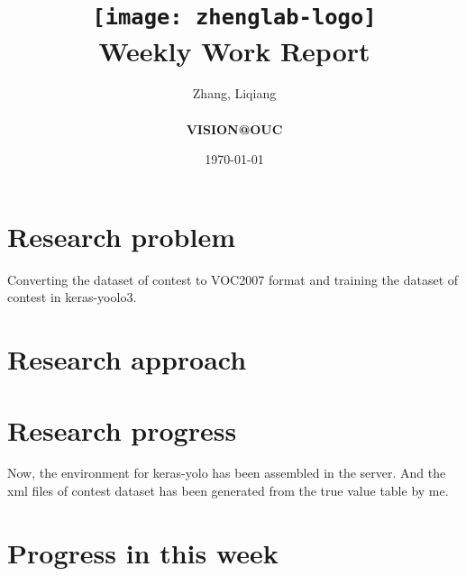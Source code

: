 \documentclass[a4paper]{article}
\title{
	\vspace*{1in}
	\texttt{[image: zhenglab-logo]} \\
	\vspace*{1.2in}
	\textbf{\huge Weekly Work Report}
	\vspace{0.2in}
}
\author{Zhang, Liqiang \\
	\vspace*{0.5in} \\
	\textbf{VISION@OUC} \\
	\vspace*{1in}
}
\date{\today}
\begin{document}
	
	\maketitle
	\setcounter{page}{0}
	\thispagestyle{empty}
	\newpage
\section{Research problem}
Converting the dataset of contest to VOC2007 format and training the dataset of contest in keras-yoolo3.
\section{Research approach}

\section{Research progress}
Now, the environment for keras-yolo has been assembled in the server. And the xml files of contest dataset has been generated from the true value table by me.
\section{Progress in this week}
\end{document}
